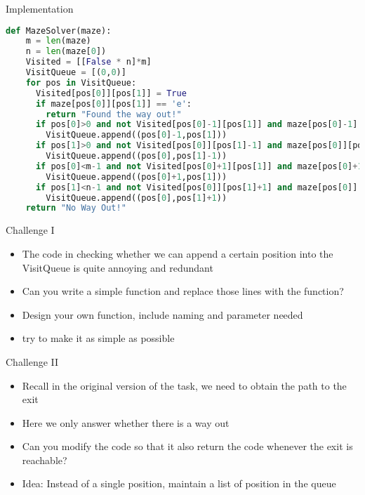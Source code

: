 \documentclass[10pt,xcolor={table,dvipsnames},t]{beamer}
\begin{document}
\begin{frame}[fragile]{Implementation}
\begin{lstlisting}[language=python]
  def MazeSolver(maze):
    m = len(maze)
    n = len(maze[0])
    Visited = [[False * n]*m]
    VisitQueue = [(0,0)]
    for pos in VisitQueue:
      Visited[pos[0]][pos[1]] = True
      if maze[pos[0]][pos[1]] == 'e':
        return "Found the way out!"
      if pos[0]>0 and not Visited[pos[0]-1][pos[1]] and maze[pos[0]-1][pos[1]] != 'o':
        VisitQueue.append((pos[0]-1,pos[1]))
      if pos[1]>0 and not Visited[pos[0]][pos[1]-1] and maze[pos[0]][pos[1]-1] != 'o':
        VisitQueue.append((pos[0],pos[1]-1))
      if pos[0]<m-1 and not Visited[pos[0]+1][pos[1]] and maze[pos[0]+1][pos[1]] != 'o':
        VisitQueue.append((pos[0]+1,pos[1]))
      if pos[1]<n-1 and not Visited[pos[0]][pos[1]+1] and maze[pos[0]][pos[1]+1] != 'o':
        VisitQueue.append((pos[0],pos[1]+1))
    return "No Way Out!"
\end{lstlisting}
\end{frame}


\begin{frame}{Challenge I}
  \begin{itemize}
    \item The code in checking whether we can append a certain position into the VisitQueue is quite annoying and redundant
    \item Can you write a simple function and replace those lines with the function?
    \item Design your own function, include naming and parameter needed
    \item try to make it as simple as possible
  \end{itemize}
  \end{frame}

\begin{frame}{Challenge II}
  \begin{itemize}
    \item Recall in the original version of the task, we need to obtain the path to the exit
    \item Here we only answer whether there is a way out
    \item Can you modify the code so that it also return the code whenever the exit is reachable?
    \item Idea: Instead of a single position, maintain a list of position in the queue
  \end{itemize}
  \end{frame}
\end{document}
